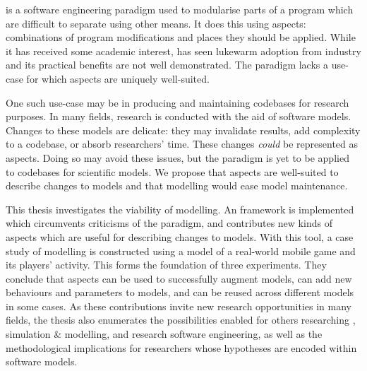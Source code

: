 
    \Aop{} is a software engineering paradigm used to modularise parts of a
    program which are difficult to separate using other means. It does this
    using aspects: combinations of program modifications and places they should
    be applied. While it has received some academic interest, \aspectorientation
    has seen lukewarm adoption from industry and its practical benefits are not
    well demonstrated. The paradigm lacks a use-case for which aspects are
    uniquely well-suited.

    One such use-case may be in producing and maintaining codebases for research
    purposes. In many fields, research is conducted with the aid of software
    models. Changes to these models are delicate: they may invalidate results,
    add complexity to a codebase, or absorb researchers' time. These changes
    \emph{could} be represented as aspects. Doing so may avoid these issues, but
    the paradigm is yet to be applied to codebases for scientific models. We
    propose that aspects are well-suited to describe changes to models and that
    \aspectoriented{} modelling would ease model maintenance.





    This thesis investigates the viability of \aspectoriented modelling. An
    \aop{} framework is implemented which circumvents criticisms of the
    paradigm, and contributes new kinds of aspects which are useful for
    describing changes to models. With this tool, a case study of
    \aspectoriented modelling is constructed using a model of a real-world
    mobile game and its players' activity. This forms the foundation of three
    experiments. They conclude that aspects can be used to successfully augment
    models, can add new behaviours and parameters to models, and can be reused
    across different models in some cases. As these contributions invite new
    research opportunities in many fields, the thesis also enumerates the
    possibilities enabled for others researching \aop{}, simulation \&
    modelling, and research software engineering, as well as the methodological
    implications for researchers whose hypotheses are encoded within software
    models.

